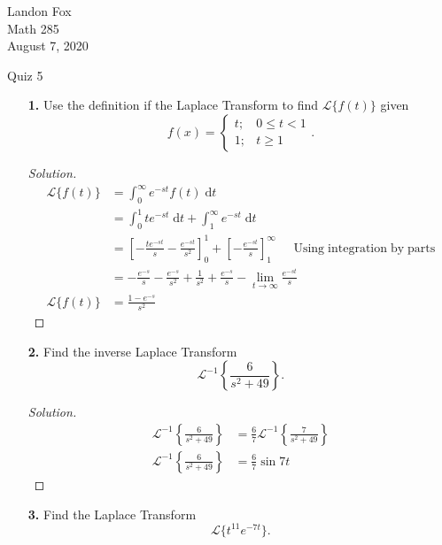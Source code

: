 \documentclass[ 12pt ]{article}
\begin{document}
\noindent Landon Fox \\
\noindent Math 285 \\
\noindent August 7, 2020

\begin{center}
\Large Quiz 5
\end{center}

\begin{enumerate}
	\item[\textbf{1.}] Use the definition if the Laplace Transform to find $\mathscr{L}\{f(t)\}$ given
		$$ f(x) = \begin{cases} t; & 0 \leq t < 1 \\ 1; & t \geq 1 \end{cases}. $$

		\begin{proof}[Solution]\renewcommand{\qedsymbol}{}
			\begin{align*}
				\mathscr{L}\{f(t)\} &= \int_0^\infty e^{-st} f(t)\; \mathrm{d}t \\
				&= \int_0^1 te^{-st}\; \mathrm{d}t + \int_1^\infty e^{-st}\; \mathrm{d}t \\
				&= \left [ -\frac{te^{-st}}{s} - \frac{e^{-st}}{s^2} \right ]_0^1 + \left [ -\frac{e^{-st}}{s} \right ]_1^\infty \;\;\;\;\; \mathrm{Using\; integration\; by\; parts} \\
				&= -\frac{e^{-s}}{s} - \frac{e^{-s}}{s^2} + \frac{1}{s^2} + \frac{e^{-s}}{s} - \lim_{t \to \infty} \frac{e^{-st}}{s} \\
				\mathscr{L}\{f(t)\} &= \frac{1 - e^{-s}}{s^2}
			\end{align*}
		\end{proof}


	\item[\textbf{2.}] Find the inverse Laplace Transform $$\mathscr{L}^{-1} \left \{ \frac{6}{s^2 + 49} \right \}.$$

		\begin{proof}[Solution]\renewcommand{\qedsymbol}{}
			\begin{align*}
				\mathscr{L}^{-1} \left \{ \frac{6}{s^2 + 49} \right \} &= \frac{6}{7} \mathscr{L}^{-1} \left \{ \frac{7}{s^2 + 49} \right \} \\
				\mathscr{L}^{-1} \left \{ \frac{6}{s^2 + 49} \right \} &= \frac{6}{7} \sin 7t
			\end{align*}
		\end{proof}


	\item[\textbf{3.}] Find the Laplace Transform $$\mathscr{L}\{t^{11}e^{-7t}\}.$$


\end{enumerate}
\end{document}
